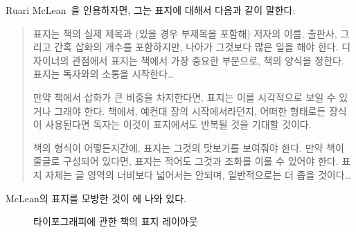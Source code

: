 Ruari McLean~\cite[p. 148]{MCLEAN80}을 인용하자면, 그는 표지에 대해서 다음과
같이 말한다:
\begin{quotation}
  표지는 책의 실제 제목과 (있을 경우 부제목을 포함해) 저자의 이름, 출판사,
  그리고 간혹 삽화의 개수를 포함하지만, 나아가 그것보다 많은 일을 해야 한다.
  디자이너의 관점에서 표지는 책에서 가장 중요한 부분으로, 책의 양식을 정한다.
  표지는 독자와의 소통을 시작한다\ldots

  만약 책에서 삽화가 큰 비중을 차지한다면, 표지는 이를 시각적으로 보일 수
  있거나 그래야 한다.
  책에서, 예컨대 장의 시작에서라던지, 어떠한 형태로든 장식이 사용된다면 독자는
  이것이 표지에서도 반복될 것을 기대할 것이다.

  책의 형식이 어떻든지간에, 표지는 그것의 맛보기를 보여줘야 한다.
  만약 책이 줄글로 구성되어 있다면, 표지는 적어도 그것과 조화를 이룰 수 있어야
  한다.
  표지 자체는 글 영역의 너비보다 넓어서는 안되며, 일반적으로는 더 좁을
  것이다\ldots

\end{quotation}

McLean의 표지를 모방한 것이 에 나와 있다.

\begin{figure}
\centering
\begin{showtitle}
\titleTH
\end{showtitle}
\caption{타이포그래피에 관한 책의 표지 레이아웃}\label{figure:titleTH}
\end{figure}


